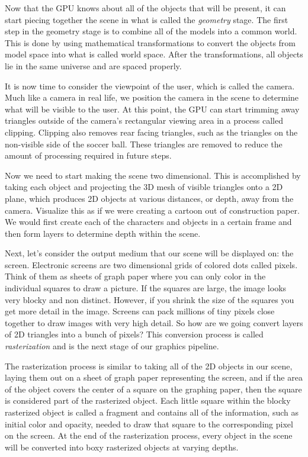 \documentclass[12pt] {article}
\begin{document}
Now that the GPU knows about all of the objects that will be present, it can start piecing together the scene in what is called the \emph{geometry} stage. The first step in the geometry stage is to combine all of the models into a common world. This is done by using mathematical transformations to convert the objects from model space into what is called world space. After the transformations, all objects lie in the same universe and are spaced properly. 


It is now time to consider the viewpoint of the user, which is called the camera. Much like a camera in real life, we position the camera in the scene to determine what will be visible to the user. At this point, the GPU can start trimming away triangles outside of the camera's rectangular viewing area in a process called clipping. Clipping also removes rear facing triangles, such as the triangles on the non-visible side of the soccer ball. These triangles are removed to reduce the amount of processing required in future steps.

Now we need to start making the scene two dimensional. This is accomplished by taking each object and projecting the 3D mesh of visible triangles onto a 2D plane, which produces 2D objects at various distances, or depth, away from the camera. Visualize this as if we were creating a cartoon out of construction paper. We would first create each of the characters and objects in a certain frame and then form layers to determine depth within the scene. 


Next, let's consider the output medium that our scene will be displayed on: the screen. Electronic screens are two dimensional grids of colored dots called pixels. Think of them as sheets of graph paper where you can only color in the individual squares to draw a picture. If the squares are large, the image looks very blocky and non distinct. However, if you shrink the size of the squares you get more detail in the image. Screens can pack millions of tiny pixels close together to draw images with very high detail. So how are we going convert layers of 2D triangles into a bunch of pixels? This conversion process is called \emph{rasterization} and is the next stage of our graphics pipeline.

The rasterization process is similar to taking all of the 2D objects in our scene, laying them out on a sheet of graph paper representing the screen, and if the area of the object covers the center of a square on the graphing paper, then the square is considered part of the rasterized object. Each little square within the blocky rasterized object is called a fragment and contains all of the information, such as initial color and opacity, needed to draw that square to the corresponding pixel on the screen. At the end of the rasterization process, every object in the scene will be converted into boxy rasterized objects at varying depths.
\end{document}
